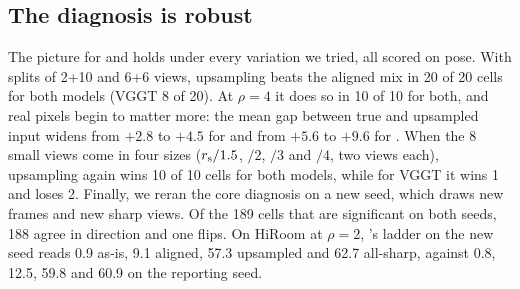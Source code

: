 \subsection{The diagnosis is robust}
\label{sec:robust}

The picture for \pithree and \dathree holds under every variation we tried, all scored on pose. With splits of 2+10 and 6+6 views, upsampling beats the aligned mix in 20 of 20 cells for both models (VGGT 8 of 20). At $\rho{=}4$ it does so in 10 of 10 for both, and real pixels begin to matter more: the mean gap between true and upsampled input widens from $+2.8$ to $+4.5$ \auc for \pithree and from $+5.6$ to $+9.6$ for \dathree. When the 8 small views come in four sizes ($r_{\mathrm{s}}/1.5$, $/2$, $/3$ and $/4$, two views each), upsampling again wins 10 of 10 cells for both models, while for VGGT it wins 1 and loses 2. Finally, we reran the core diagnosis on a new seed, which draws new frames and new sharp views. Of the 189 cells that are significant on both seeds, 188 agree in direction and one flips. On HiRoom at $\rho{=}2$, \pithree's ladder on the new seed reads 0.9 as-is, 9.1 aligned, 57.3 upsampled and 62.7 all-sharp, against 0.8, 12.5, 59.8 and 60.9 on the reporting seed.
